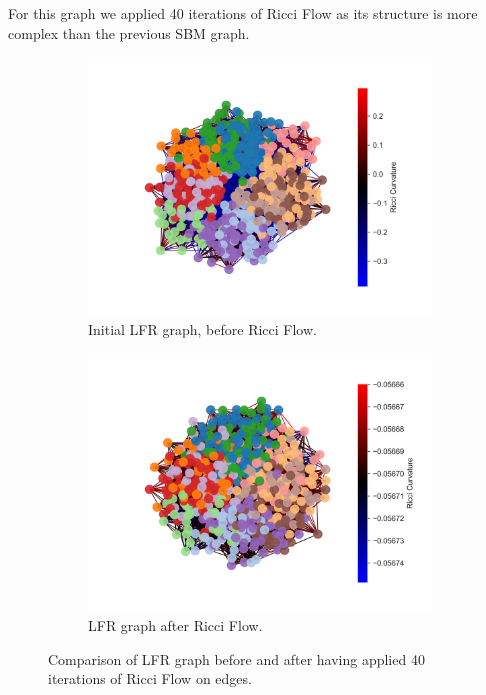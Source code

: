 For this graph we applied 40 iterations of Ricci Flow as its structure is more complex than the previous SBM graph.
\begin{figure}
    \centering
    \begin{subfigure}{0.45\textwidth}
        \centering
        \includegraphics[width=\textwidth]{../tests/ToyModelResults/LFR/Before Ricci Flow.png}
        \caption{Initial LFR graph, before Ricci Flow.}
    \end{subfigure}
    \hfill
    \begin{subfigure}{0.45\textwidth}
        \centering
        \includegraphics[width=\textwidth]{../tests/ToyModelResults/LFR/After Ricci Flow.png}
        \caption{LFR graph after Ricci Flow.}
    \end{subfigure}
    \caption{Comparison of LFR graph before and after having applied 40 iterations of  Ricci Flow on edges.}
\end{figure}\label{fig:LFR_comparison}


